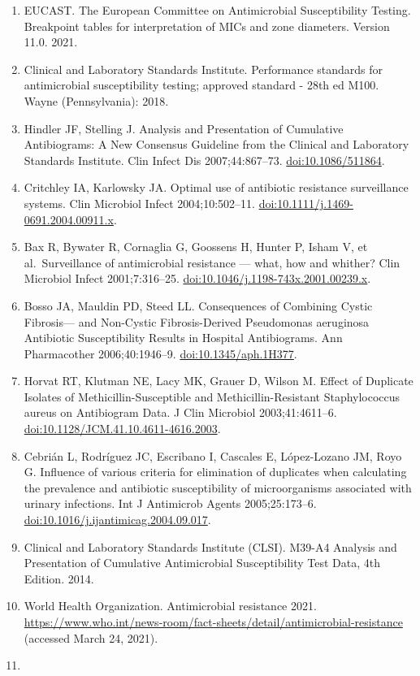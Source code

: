 \documentclass[
]{book}
\begin{document}
\begin{enumerate}
\item
  EUCAST. The European Committee on Antimicrobial Susceptibility Testing. Breakpoint tables for interpretation of MICs and zone diameters. Version 11.0. 2021.
\item
  Clinical and Laboratory Standards Institute. Performance standards for antimicrobial susceptibility testing; approved standard - 28th ed M100. Wayne (Pennsylvania): 2018.
\item
  Hindler JF, Stelling J. Analysis and Presentation of Cumulative Antibiograms: A New Consensus Guideline from the Clinical and Laboratory Standards Institute. Clin Infect Dis 2007;44:867--73. \url{doi:10.1086/511864}.
\item
  Critchley IA, Karlowsky JA. Optimal use of antibiotic resistance surveillance systems. Clin Microbiol Infect 2004;10:502--11. \url{doi:10.1111/j.1469-0691.2004.00911.x}.
\item
  Bax R, Bywater R, Cornaglia G, Goossens H, Hunter P, Isham V, et al.~Surveillance of antimicrobial resistance --- what, how and whither? Clin Microbiol Infect 2001;7:316--25. \url{doi:10.1046/j.1198-743x.2001.00239.x}.
\item
  Bosso JA, Mauldin PD, Steed LL. Consequences of Combining Cystic Fibrosis--- and Non-Cystic Fibrosis-Derived Pseudomonas aeruginosa Antibiotic Susceptibility Results in Hospital Antibiograms. Ann Pharmacother 2006;40:1946--9. \url{doi:10.1345/aph.1H377}.
\item
  Horvat RT, Klutman NE, Lacy MK, Grauer D, Wilson M. Effect of Duplicate Isolates of Methicillin-Susceptible and Methicillin-Resistant Staphylococcus aureus on Antibiogram Data. J Clin Microbiol 2003;41:4611--6. \url{doi:10.1128/JCM.41.10.4611-4616.2003}.
\item
  Cebrián L, Rodríguez JC, Escribano I, Cascales E, López-Lozano JM, Royo G. Influence of various criteria for elimination of duplicates when calculating the prevalence and antibiotic susceptibility of microorganisms associated with urinary infections. Int J Antimicrob Agents 2005;25:173--6. \url{doi:10.1016/j.ijantimicag.2004.09.017}.
\item
  Clinical and Laboratory Standards Institute (CLSI). M39-A4 Analysis and Presentation of Cumulative Antimicrobial Susceptibility Test Data, 4th Edition. 2014.
\item
  World Health Organization. Antimicrobial resistance 2021. \url{https://www.who.int/news-room/fact-sheets/detail/antimicrobial-resistance} (accessed March 24, 2021).
\item

\end{enumerate}
\end{document}
